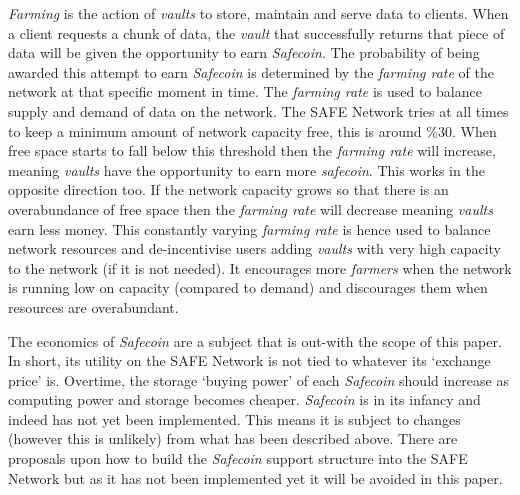 \textit{Farming} is the action of \textit{vaults} to store, maintain and serve data to clients. When a client requests a chunk of data, the \textit{vault} that successfully returns that piece of data will be given the opportunity to earn \textit{Safecoin}. The probability of being awarded this attempt to earn \textit{Safecoin} is determined by the \textit{farming rate} of the network at that specific moment in time. The \textit{farming rate} is used to balance supply and demand of data on the network. The SAFE Network tries at all times to keep a minimum amount of network capacity free, this is around \%30. When free space starts to fall below this threshold then the \textit{farming rate} will increase, meaning \textit{vaults} have the opportunity to earn more \textit{safecoin}. This works in the opposite direction too. If the network capacity grows so that there is an overabundance of free space then the \textit{farming rate} will decrease meaning \textit{vaults} earn less money. This constantly varying \textit{farming rate} is hence used to balance network resources and de-incentivise users adding \textit{vaults} with very high capacity to the network (if it is not needed). It encourages more \textit{farmers} when the network is running low on capacity (compared to demand) and discourages them when resources are overabundant.

The economics of \textit{Safecoin} are a subject that is out-with the scope of this paper. In short, its utility on the SAFE Network is not tied to whatever its `exchange price' is. Overtime, the storage `buying power' of each \textit{Safecoin} should increase as computing power and storage becomes cheaper. \textit{Safecoin} is in its infancy and indeed has not yet been implemented. This means it is subject to changes (however this is unlikely) from what has been described above. There are proposals upon how to build the \textit{Safecoin} support structure into the SAFE Network but as it has not been implemented yet it will be avoided in this paper.


